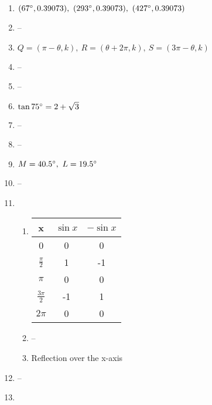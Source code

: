 \documentclass{article}
\begin{document}
\begin{enumerate}
\begin{enumerate}
	\end{enumerate}

\item $(67\degree, 0.39073), \ (293\degree, 0.39073), \ (427\degree, 0.39073)$

\item --

\item $Q = (\pi - \theta, k), \ R = (\theta + 2\pi, k), \ S = (3\pi - \theta, k)$

\item --

\item --

\item $\tan{75\degree} = 2 + \sqrt{3}$

\item --

\item --

\item $M = 40.5\degree, \ L = 19.5\degree$

\item --

\item 

	\begin{enumerate}
	
	\item 
	
	\begin{tabular}{ c | c | c }
	
	x & $\sin{x}$ & $-\sin{x}$ \\
	\hline
	0 & 0 & 0 \\
	$\frac{\pi}{2}$ & 1 & -1 \\
	$\pi$ & 0 & 0 \\
	$\frac{3\pi}{2}$ & -1 & 1 \\
	$2\pi$ & 0 & 0
	
	\end{tabular}
	
	\item --
	
	\item Reflection over the x-axis
	
	\end{enumerate}
	
\item --

\item

	\begin{enumerate}
	

\end{enumerate}
\end{enumerate}
\end{document}
